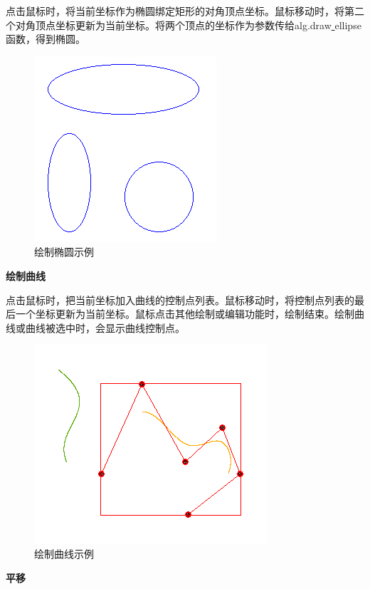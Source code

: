 \documentclass[a4paper,UTF8]{article}
\begin{document}
点击鼠标时，将当前坐标作为椭圆绑定矩形的对角顶点坐标。鼠标移动时，将第二个对角顶点坐标更新为当前坐标。将两个顶点的坐标作为参数传给alg.draw\underline{ }ellipse函数，得到椭圆。
\begin{figure}[H]
    \centering
    \includegraphics[scale=0.8]{draw-ellipse.PNG}
    \caption{绘制椭圆示例}
\end{figure}


\textbf{绘制曲线}

点击鼠标时，把当前坐标加入曲线的控制点列表。鼠标移动时，将控制点列表的最后一个坐标更新为当前坐标。鼠标点击其他绘制或编辑功能时，绘制结束。绘制曲线或曲线被选中时，会显示曲线控制点。
\begin{figure}[H]
    \centering
    \includegraphics[scale=0.8]{draw-curve.PNG}
    \caption{绘制曲线示例}
\end{figure}


\textbf{平移}
\end{document}
